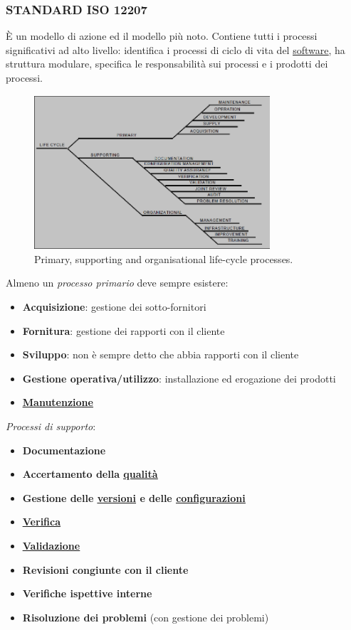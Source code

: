 			\subsubsection{STANDARD ISO 12207}		\label{12207}
			È un modello di azione ed il modello più noto. Contiene tutti i processi significativi ad alto livello: identifica i processi di ciclo di vita del \underline{\hyperref[prodotto]{software}}, ha struttura modulare, specifica le responsabilità sui processi e i prodotti dei processi.

			\begin{figure}[H]
				\centering
				\includegraphics[width=0.78\textwidth]{img/iso}
				\caption{Primary, supporting and organisational life-cycle processes.}
			\end{figure}

			Almeno un \textit{processo primario} deve sempre esistere:
				\begin{itemize}
					\item \textbf{Acquisizione}: gestione dei sotto-fornitori
					\item \textbf{Fornitura}: gestione dei rapporti con il cliente
					\item \textbf{Sviluppo}: non è sempre detto che abbia rapporti con il cliente
					\item \textbf{Gestione operativa/utilizzo}: installazione ed erogazione dei prodotti
					\item \textbf{\underline{\hyperref[manutenzione]{Manutenzione}}}
				\end{itemize}

			\textit{Processi di supporto}:
				\begin{itemize}
					\item \textbf{Documentazione}
					\item \textbf{Accertamento della \underline{\hyperref[qualita]{qualità}}}
					\item \textbf{Gestione delle \underline{\hyperref[versione]{versioni}} e delle \underline{\hyperref[configurazione]{configurazioni}}}
					\item \textbf{\underline{\hyperref[verificare]{Verifica}}}
					\item \textbf{\underline{\hyperref[validare]{Validazione}}}
					\item \textbf{Revisioni congiunte con il cliente}
					\item \textbf{Verifiche ispettive interne}
					\item \textbf{Risoluzione dei problemi} (con gestione dei problemi)
				\end{itemize}


